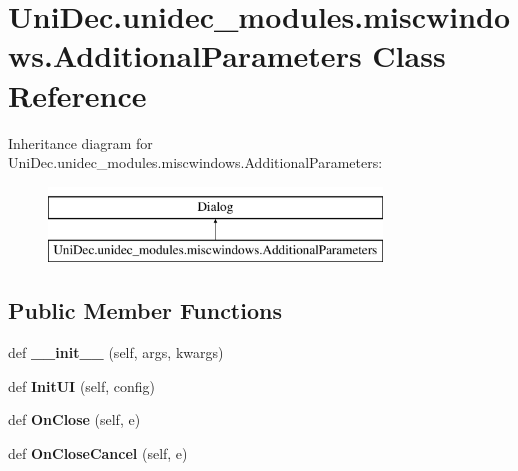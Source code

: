 \hypertarget{class_uni_dec_1_1unidec__modules_1_1miscwindows_1_1_additional_parameters}{}\section{Uni\+Dec.\+unidec\+\_\+modules.\+miscwindows.\+Additional\+Parameters Class Reference}
\label{class_uni_dec_1_1unidec__modules_1_1miscwindows_1_1_additional_parameters}
Inheritance diagram for Uni\+Dec.\+unidec\+\_\+modules.\+miscwindows.\+Additional\+Parameters\+:\begin{figure}[H]
\begin{center}
\leavevmode
\includegraphics[height=2.000000cm]{class_uni_dec_1_1unidec__modules_1_1miscwindows_1_1_additional_parameters}
\end{center}
\end{figure}
\subsection*{Public Member Functions}
\begin{DoxyCompactItemize}
\item 
\hypertarget{class_uni_dec_1_1unidec__modules_1_1miscwindows_1_1_additional_parameters_a0fcdbada2f592331ca87f6b52fc16416}{}def {\bfseries \+\_\+\+\_\+init\+\_\+\+\_\+} (self, args, kwargs)\label{class_uni_dec_1_1unidec__modules_1_1miscwindows_1_1_additional_parameters_a0fcdbada2f592331ca87f6b52fc16416}

\item 
\hypertarget{class_uni_dec_1_1unidec__modules_1_1miscwindows_1_1_additional_parameters_a572be26c964fc991006722a73a760266}{}def {\bfseries Init\+U\+I} (self, config)\label{class_uni_dec_1_1unidec__modules_1_1miscwindows_1_1_additional_parameters_a572be26c964fc991006722a73a760266}

\item 
\hypertarget{class_uni_dec_1_1unidec__modules_1_1miscwindows_1_1_additional_parameters_ab42ab19c0ecdc2b2a394d234fa536644}{}def {\bfseries On\+Close} (self, e)\label{class_uni_dec_1_1unidec__modules_1_1miscwindows_1_1_additional_parameters_ab42ab19c0ecdc2b2a394d234fa536644}

\item 
\hypertarget{class_uni_dec_1_1unidec__modules_1_1miscwindows_1_1_additional_parameters_a797d7474731ae966dbeab0799d0eeecd}{}def {\bfseries On\+Close\+Cancel} (self, e)\label{class_uni_dec_1_1unidec__modules_1_1miscwindows_1_1_additional_parameters_a797d7474731ae966dbeab0799d0eeecd}

\end{DoxyCompactItemize}
